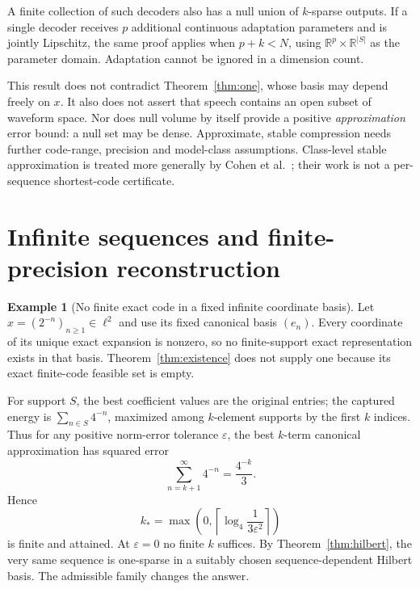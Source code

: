 \documentclass[11pt,a4paper]{article}
\theoremstyle{definition}
\newtheorem{example}{Example}
\theoremstyle{remark}
\newcommand{\R}{\mathbb R}
\begin{document}
A finite collection of such decoders also has a null union of $k$-sparse outputs.
If a single decoder receives $p$ additional continuous adaptation parameters
and is jointly Lipschitz, the same proof applies when $p+k<N$, using
$\R^p\times\R^{|S|}$ as the parameter domain. Adaptation cannot be ignored in
a dimension count.

This result does not contradict Theorem~\ref{thm:one}, whose basis may depend
freely on $x$. It also does not assert that speech contains an open subset of
waveform space. Nor does null volume by itself provide a positive
\emph{approximation} error bound: a null set may be dense. Approximate, stable
compression needs further code-range, precision and model-class assumptions.
Class-level stable approximation is treated more generally by
Cohen et al.~\cite{cohen2020}; their work is not a per-sequence shortest-code
certificate.

\section{Infinite sequences and finite-precision reconstruction}

\begin{example}[No finite exact code in a fixed infinite coordinate basis]\label{ex:infinite}
Let $x=(2^{-n})_{n\geq1}\in\ell^2$ and use its fixed canonical basis $(e_n)$.
Every coordinate of its unique exact expansion is nonzero, so no finite-support
exact representation exists in that basis. Theorem~\ref{thm:existence} does not
supply one because its exact finite-code feasible set is empty.

For support $S$, the best coefficient values are the original entries; the
captured energy is $\sum_{n\in S}4^{-n}$, maximized among $k$-element supports
by the first $k$ indices. Thus for any positive norm-error tolerance
$\varepsilon$, the best $k$-term canonical approximation has squared error
\[
\sum_{n=k+1}^\infty 4^{-n}=\frac{4^{-k}}{3}.
\]
Hence
\[
k_*=\max\!\left(0,\left\lceil\log_4\frac{1}{3\varepsilon^2}\right\rceil\right)
\]
is finite and attained. At $\varepsilon=0$ no finite $k$ suffices.
By Theorem~\ref{thm:hilbert}, the very same sequence is one-sparse in a suitably
chosen sequence-dependent Hilbert basis. The admissible family changes the answer.
\end{example}
\end{document}
